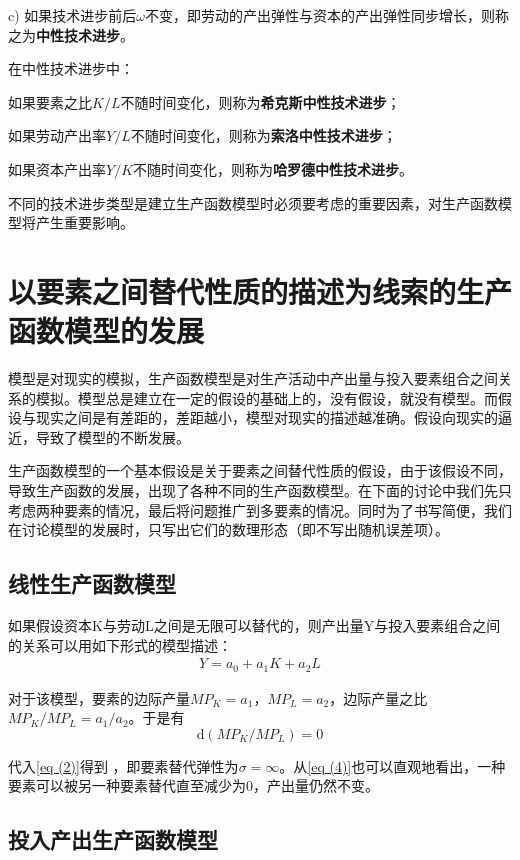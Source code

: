 	c) 如果技术进步前后$ \omega $不变，即劳动的产出弹性与资本的产出弹性同步增长，则称之为\textbf{中性技术进步}。
			
	在中性技术进步中：
			
	如果要素之比$ K/L $不随时间变化，则称为{\bf{希克斯中性技术进步}}；
			
	如果劳动产出率$ Y/L $不随时间变化，则称为{\bf{索洛中性技术进步}}；
			
	如果资本产出率$ Y/K $不随时间变化，则称为{\bf{哈罗德中性技术进步}}。
			
	不同的技术进步类型是建立生产函数模型时必须要考虑的重要因素，对生产函数模型将产生重要影响。 

\section{以要素之间替代性质的描述为线索的生产函数模型的发展}
	模型是对现实的模拟，生产函数模型是对生产活动中产出量与投入要素组合之间关系的模拟。模型总是建立在一定的假设的基础上的，没有假设，就没有模型。而假设与现实之间是有差距的，差距越小，模型对现实的描述越准确。假设向现实的逼近，导致了模型的不断发展。
			
	生产函数模型的一个基本假设是关于要素之间替代性质的假设，由于该假设不同，导致生产函数的发展，出现了各种不同的生产函数模型。在下面的讨论中我们先只考虑两种要素的情况，最后将问题推广到多要素的情况。同时为了书写简便，我们在讨论模型的发展时，只写出它们的数理形态（即不写出随机误差项）。
	
	\subsection{线性生产函数模型}
			
	如果假设资本K与劳动L之间是无限可以替代的，则产出量Y与投入要素组合之间的关系可以用如下形式的模型描述：	
	\begin{align}
		Y=a_{0}+a_{1} K+a_{2} L \label{eq (4)}
	\end{align}

	对于该模型，要素的边际产量$ MP_{K} = a_{1} $，$ MP_{L} = a_{2} $，边际产量之比$ MP_{K}/MP_{L} = a_{1}/a_{2} $。于是有
	$$ \mathrm{d}\left (MP_{K}/MP_{L}\right ) = 0 $$

	代入\eqref{eq (2)}得到 ，即要素替代弹性为$ \sigma = \infty $。从\eqref{eq (4)}也可以直观地看出，一种要素可以被另一种要素替代直至减少为0，产出量仍然不变。
	
	\subsection{投入产出生产函数模型}
		

